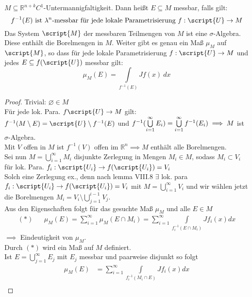   \begin{theorem}[Flächenmaß]
    $M \subseteq \mathbb{R}^{n+k} C^1$-Untermannigfaltigkeit. Dann heißt $E \subseteq M$ messbar, falls gilt:
    $$f^{-1}(E) \text{ ist } \lambda^n\text{-messbar für jede lokale Parametrisierung } f: \script{U} \to M$$
    Das System $\script{M}$ der messbaren Teilmengen von $M$ ist eine $\sigma$-Algebra. Diese enthält die Borelmengen in $M$. Weiter gibt es genau ein Maß $\mu_M$ auf $\script{M}$, so dass für jede lokale Parametrisierung $f: \script{U} \to M$ und jedes $E \subseteq f(\script{U})$ messbar gilt:
    $$\mu_M(E) = \int\limits_{f^{-1}(E)}Jf(x) \ dx$$
  \end{theorem}
  \begin{proof}
    \item[Trivial:] $\varnothing \in M$ \\
    Für jede lok. Para. $f\script{U} \to M$ gilt: $f^{-1}(M\setminus E) = \script{U}\setminus f^{-1}(E)$ und $f^{-1}(\bigcup\limits_{i=1}^\infty E_i) = \bigcup\limits_{i=1}^\infty f^{-1}(E_i) \\
    \implies M$ ist $\sigma$-Algebra. \\
    Mit $V$ offen in $M$ ist $f^{-1}(V)$ offen im $\mathbb{R}^n \implies M$ enthält alle Borelmengen. \\
    Sei nun $M = \bigcup\limits_{i=1}^\infty M_i$ disjunkte Zerlegung in Mengen $M_i\in M$, sodass $M_i \subset V_i$ für lok. Para. $f_i: \script{U_i}\to f(\script{U_i}) = V_i$ \\
    Solch eine Zerlegung ex., denn nach lemma VIII.8 $\exists$ lok. para $f_i:\script{U_i} \to f(\script{U_i}) = V_i$ mit $M = \bigcup\limits_{i=1}^\infty V_i$ und wir wählen jetzt die Borelmengen $M_i = V_i \setminus \bigcup\limits_{j=1}^{i-1}V_j$. \\
    Aus den Eigenschaften folgt für das gesuchte Maß $\mu_M$ und alle $E\in M$ 
    \begin{align*}
    	(\ast) && \mu_M(E) = \sum\limits_{i=1}^\infty \mu_M(E\cap M_i) = \sum\limits_{i=1}^\infty \int\limits_{f_i^{-1}(E\cap M_i)} J f_i(x) dx 
    \end{align*}
	$\implies$ Eindeutigkeit von $\mu_M$. \\
	Durch $(\ast)$ wird ein Maß auf $M$ definiert. \\
	Ist $E = \bigcup\limits_{j=1}^\infty E_j$ mit $E_j$ messbar und paarweise disjunkt so folgt 
	\begin{align*}
		\mu_M(E) &= \sum\limits_{i=1}^\infty \int\limits_{f_i^{-1}(M_i\cap E)}Jf_i(x) dx  \\

\end{align*}
\end{proof}
